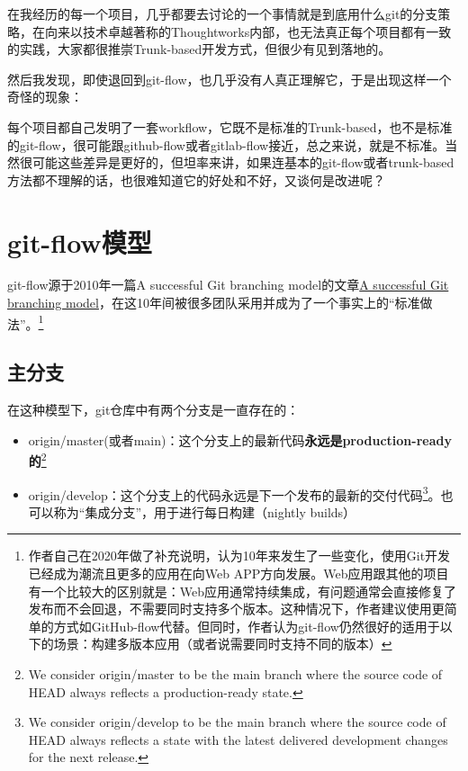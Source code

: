 \documentclass[12pt]{article}
\begin{document}
\makeblogtitle

在我经历的每一个项目，几乎都要去讨论的一个事情就是到底用什么git的分支策略，在向来以技术卓越著称的Thoughtworks内部，也无法真正每个项目都有一致的实践，大家都很推崇Trunk-based开发方式，但很少有见到落地的。

然后我发现，即使退回到git-flow，也几乎没有人真正理解它，于是出现这样一个奇怪的现象：

每个项目都自己发明了一套workflow，它既不是标准的Trunk-based，也不是标准的git-flow，很可能跟github-flow或者gitlab-flow接近，总之来说，就是不标准。当然很可能这些差异是更好的，但坦率来讲，如果连基本的git-flow或者trunk-based方法都不理解的话，也很难知道它的好处和不好，又谈何是改进呢？

\section{git-flow模型}\label{git-flowux6a21ux578b}

git-flow源于2010年一篇A successful Git branching model的文章\href{https://nvie.com/posts/a-successful-git-branching-model}{A successful Git branching model}，在这10年间被很多团队采用并成为了一个事实上的``标准做法''。\footnote{作者自己在2020年做了补充说明，认为10年来发生了一些变化，使用Git开发已经成为潮流且更多的应用在向Web APP方向发展。Web应用跟其他的项目有一个比较大的区别就是：Web应用通常持续集成，有问题通常会直接修复了发布而不会回退，不需要同时支持多个版本。这种情况下，作者建议使用更简单的方式如GitHub-flow代替。但同时，作者认为git-flow仍然很好的适用于以下的场景：构建多版本应用（或者说需要同时支持不同的版本）}

\pandocbounded{}

\subsection{主分支}\label{ux4e3bux5206ux652f}

在这种模型下，git仓库中有两个分支是一直存在的：

\begin{itemize}
\tightlist
\item
  origin/master(或者main)：这个分支上的最新代码\textbf{永远是production-ready的}\footnote{We consider origin/master to be the main branch where the source code of HEAD always reflects a production-ready state.}
\item
  origin/develop：这个分支上的代码永远是下一个发布的最新的交付代码\footnote{We consider origin/develop to be the main branch where the source code of HEAD always reflects a state with the latest delivered development changes for the next release.}。也可以称为``集成分支''，用于进行每日构建（nightly builds）
\end{itemize}
\end{document}
